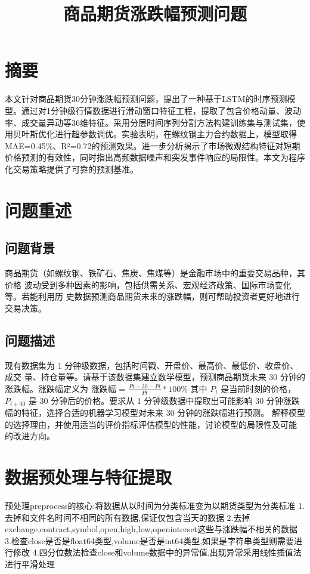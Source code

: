 \documentclass[a4paper,12pt]{ctexart}
\title{ 商品期货涨跌幅预测问题}
\date{}
\begin{document}
\maketitle
 

 
\section{摘要}
本文针对商品期货30分钟涨跌幅预测问题，提出了一种基于LSTM的时序预测模型。通过对1分钟级行情数据进行滑动窗口特征工程，提取了包含价格动量、波动率、成交量异动等36维特征。采用分层时间序列分割方法构建训练集与测试集，使用贝叶斯优化进行超参数调优。实验表明，在螺纹钢主力合约数据上，模型取得MAE=0.45\%、R²=0.72的预测效果。进一步分析揭示了市场微观结构特征对短期价格预测的有效性，同时指出高频数据噪声和突发事件响应的局限性。本文为程序化交易策略提供了可靠的预测基准。
 
\section{问题重述}
\subsection{问题背景}
商品期货（如螺纹钢、铁矿石、焦炭、焦煤等）是金融市场中的重要交易品种，其价格
波动受到多种因素的影响，包括供需关系、宏观经济政策、国际市场变化等。若能利用历
史数据预测商品期货未来的涨跌幅，则可帮助投资者更好地进行交易决策。




\subsection{问题描述}
现有数据集为 1 分钟级数据，包括时间戳、开盘价、最高价、最低价、收盘价、成交
量、持仓量等。请基于该数据集建立数学模型，预测商品期货未来 30 分钟的涨跌幅。涨跌幅定义为
涨跌幅 = ${ \frac{Pt+30 - Pt}{Pt} * 100\% }$
其中 $P_t$ 是当前时刻的价格，$P_{t+30}$ 是 30 分钟后的价格。要求从 1 分钟级数据中提取出可能影响 30 分钟涨跌幅的特征，选择合适的机器学习模型对未来 30 分钟的涨跌幅进行预测。
解释模型的选择理由，并使用适当的评价指标评估模型的性能，讨论模型的局限性及可能
的改进方向。
\section{数据预处理与特征提取}



预处理preprocess的核心:将数据从以时间为分类标准变为以期货类型为分类标准
1.去掉和文件名时间不相同的所有数据,保证仅包含当天的数据
2.去掉exchange,contract,symbol,open,high,low,openinterset这些与涨跌幅不相关的数据
3.检查close是否是float64类型,volume是否是int64类型,如果是字符串类型则需要进行修改
4.四分位数法检查close和volume数据中的异常值,出现异常采用线性插值法进行平滑处理
\end{document}
